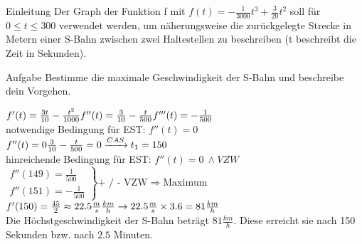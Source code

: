 \documentclass[arbeitsmappe.tex]{subfiles}
\begin{document}
    \begin{gblock}{Einleitung}
        Der Graph der Funktion f mit $f(t) = -\frac{1}{3000}t^3 + \frac{3}{20}t^2$ soll für $0 \leq t \leq 300$ verwendet werden,
        um näherungsweise die zurückgelegte Strecke in Metern einer S-Bahn zwischen zwei Haltestellen zu beschreiben (t beschreibt die Zeit in Sekunden).
    \end{gblock}

    \begin{rblock}{Aufgabe}
        Bestimme die maximale Geschwindigkeit der S-Bahn und beschreibe dein Vorgehen.
    \end{rblock}

    $
    f'(t) = \frac{3t}{10} - \frac{t^2}{1000} \\
    f''(t) = \frac{3}{10} - \frac{t}{500} \\
    f'''(t) = -\frac{1}{500}
    $
    \\
    notwendige Bedingung für EST: $f''(t) = 0$
    \\
    $
    f''(t) = 0 \\
    \frac{3}{10} - \frac{t}{500} = 0 \\
    \xrightarrow{CAS} t_1 = 150
    $
    \\
    hinreichende Bedingung für EST: $f''(t) = 0\ \land VZW$
    \\
    $
    \left.
    \begin{array}{l}
        f''(149) = \frac{1}{500} \\
        f''(151) = -\frac{1}{500}
    \end{array}
    \right\} \text{+ / - VZW} \Rightarrow \text{Maximum}
    $
    \\
    $
    f'(150) = \frac{45}{2} \approx 22.5 \frac{m}{s} \\
    \frac{km}{h} \to 22.5\frac{m}{s} \times 3.6 = 81\frac{km}{h}
    $
    \\
    Die Höchstgeschwindigkeit der S-Bahn beträgt $81 \frac{km}{h}$. Diese erreicht sie nach 150 Sekunden bzw. nach $2.5$ Minuten.
\end{document}
